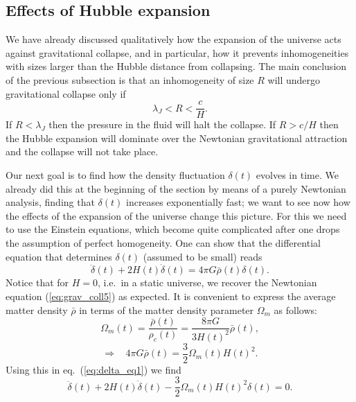 \documentclass[11pt, a4paper,oneside,openright]{book}
\numberwithin{equation}{section}
\begin{document}
\subsection{Effects of Hubble expansion}

We have already discussed qualitatively how the expansion of the universe acts against gravitational collapse, and in particular, how it prevents inhomogeneities with sizes larger than the Hubble distance from collapsing. The main conclusion of the previous subsection is that an inhomogeneity of size $R$ will undergo gravitational collapse only if
\begin{equation}
\lambda_J<R<\frac{c}{H}.
\end{equation}
If $R<\lambda_J$ then the pressure in the fluid will halt the collapse. If $R>c/H$ then the Hubble expansion will dominate over the Newtonian gravitational attraction and the collapse will not take place.

Our next goal is to find how the density fluctuation $\delta(t)$ evolves in time. We already did this at the beginning of the section by means of a purely Newtonian analysis, finding that $\delta(t)$ increases exponentially fast; we want to see now how the effects of the expansion of the universe change this picture. For this we need to use the Einstein equations, which become quite complicated after one drops the assumption of perfect homogeneity. One can show that the differential equation that determines $\delta(t)$ (assumed to be small) reads
\begin{equation} \label{eq:delta_eq1}
\ddot{\delta}(t)+2H(t)\dot{\delta}(t)=4\pi G\bar{\rho}(t)\delta(t).
\end{equation}
Notice that for $H=0$, i.e.\ in a static universe, we recover the Newtonian equation (\ref{eq:grav_coll5}) as expected. It is convenient to express the average matter density $\bar{\rho}$ in terms of the matter density parameter $\Omega_m$ as follows:
\begin{equation}
\Omega_m(t)=\frac{\bar{\rho}(t)}{\rho_c(t)}=\frac{8\pi G}{3H(t)^2}\bar{\rho}(t),
\end{equation}
\begin{equation}
\Rightarrow~~~~ 4\pi G\bar{\rho}(t)=\frac{3}{2}\Omega_m(t)H(t)^2.
\end{equation}
Using this in eq.\ (\ref{eq:delta_eq1}) we find
\begin{equation} \label{eq:delta_eq2}
\ddot{\delta}(t)+2H(t)\dot{\delta}(t)-\frac{3}{2}\Omega_m(t)H(t)^2\delta(t)=0.
\end{equation}
\end{document}
